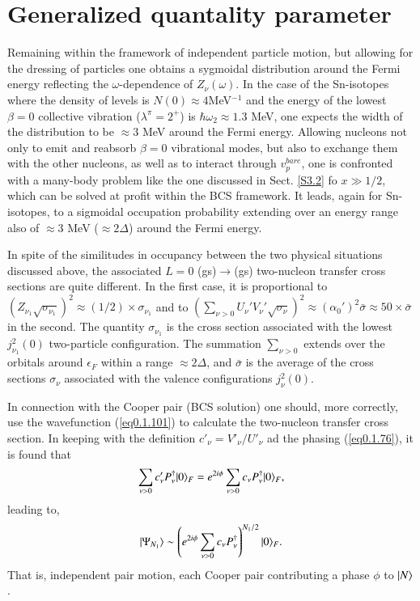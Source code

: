  \section{Generalized quantality parameter}\label{App1D}
 Remaining within the framework of independent particle motion, but allowing for the dressing of particles one obtains a sygmoidal distribution around the Fermi energy reflecting the $\omega$-dependence of $Z_\nu(\omega)$. In the case of the Sn-isotopes where the density of levels is $N(0)\approx 4$MeV$^{-1}$ and the energy of the lowest $\beta=0$ collective vibration ($\lambda^\pi=2^+$) is $\hbar\omega_2\approx1.3$ MeV, one expects the width of the distribution to be $\approx3$ MeV around the Fermi energy. Allowing nucleons not only to emit and reabsorb $\beta=0$ vibrational modes, but also to exchange them with the other nucleons, as well as to interact through $v_{p}^{bare}$, one is confronted with a many-body problem like the one discussed in Sect. \ref{S3.2}  fo $x\gg1/2$,  which can be solved at profit within the BCS framework. It leads, again for Sn-isotopes, to a sigmoidal occupation probability extending over an energy range also of $\approx 3$ MeV ($\approx 2\Delta$) around the Fermi energy. 
 
 
 In spite of the similitudes in occupancy between the two physical situations discussed above, the associated $L=0$ (gs)$\to$(gs) two-nucleon transfer cross sections are quite different. In the first case, it is proportional to $(Z_{\nu_1}\sqrt{\sigma_{\nu_1}})^2\approx(1/2)\times\sigma_{\nu_1}$ and to $(\sum_{\nu>0}U_{\nu}'V_{\nu}'\sqrt{\sigma_\nu})^2\approx(\alpha_0')^2\bar\sigma\approx50\times\bar\sigma$ in the second. The quantity $\sigma_{\nu_1}$ is the cross section associated with the lowest $ j_{\nu_1}^2(0)$ two-particle configuration. The summation $\sum_{\nu>0}$ extends over the orbitals around $\epsilon_F$ within a range $\approx2\Delta$, and $\bar\sigma$ is the average of the cross sections $\sigma_\nu$ associated with the valence configurations $j^2_\nu(0)$.
 
 In connection with the Cooper pair (BCS solution) one should,
  more correctly, use the wavefunction (\ref{eq0.1.101}) to calculate the two-nucleon transfer cross section. In keeping with the definition $c'_\nu=V'_\nu/U'_\nu$ ad the phasing (\ref{eq0.1.76}), it is found that
\begin{align}\label{eq3.4.1}
	\sum_{\nu>0}c'_\nu P_\nu^\dagger|{0} \rangle_F=e^{2i\phi}\sum_{\nu>0}c_\nu P_\nu^\dagger|{0} \rangle_F,
\end{align}
leading to,
 \begin{align}\label{eq3.4.2}
|{\Psi_{N_1}} \rangle\sim\left(e^{2i\phi}\sum_{\nu>0}c_\nu P^\dagger_\nu\right)^{N_1/2}|{0} \rangle_F.
 \end{align}
 That is, independent pair motion, each Cooper pair contributing a phase $\phi$ to $|{N} \rangle$.
 
